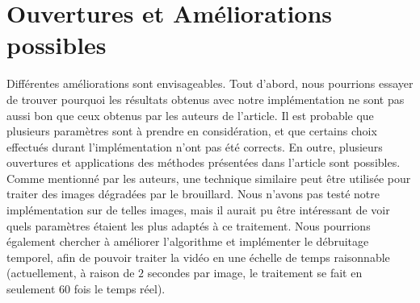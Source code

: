 \documentclass[twoside]{article}
\begin{document}
\section{Ouvertures et Améliorations possibles}
Différentes améliorations sont envisageables. Tout d'abord, nous pourrions essayer de trouver pourquoi les résultats obtenus avec notre implémentation ne sont pas aussi bon que ceux obtenus par les auteurs de l'article. Il est probable que plusieurs paramètres sont à prendre en considération, et que certains choix effectués durant l'implémentation n'ont pas été corrects. En outre, plusieurs ouvertures et applications des méthodes présentées dans l'article sont possibles. Comme mentionné par les auteurs, une technique similaire peut être utilisée pour traiter des images dégradées par le brouillard. Nous n'avons pas testé notre implémentation sur de telles images, mais il aurait pu être intéressant de voir quels paramètres étaient les plus adaptés à ce traitement. Nous pourrions également chercher à améliorer l'algorithme et implémenter le débruitage temporel, afin de pouvoir traiter la vidéo en une échelle de temps raisonnable (actuellement, à raison de $2$ secondes par image, le traitement se fait en seulement $60$ fois le temps réel).

\end{document}
